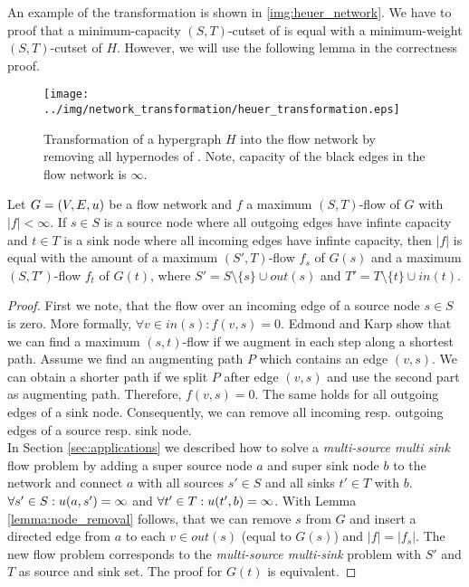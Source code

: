 An example of the transformation is shown in \autoref{img:heuer_network}.
We have to proof that a minimum-capacity $(S,T)$-cutset
of  is equal with a minimum-weight $(S,T)$-cutset of $H$. However,
we will use the following lemma in the correctness proof.

\begin{figure}
\centering
\texttt{[image: ../img/network\_transformation/heuer\_transformation.eps]}
\caption{Transformation of a hypergraph $H$ into the flow network  by removing
         all hypernodes of . Note, capacity of the black edges in the flow network is $\infty$.}
\label{img:heuer_network}
\end{figure} 

\begin{lemma}
\label{lemma:source_and_sink_removal}
Let $G = (V,E,u)$ be a flow network and $f$ a maximum $(S,T)$-flow of $G$ with $|f| < \infty$.
If $s \in S$ is a source node where all outgoing edges have infinte capacity and
$t \in T$ is a sink node where all incoming edges have infinte capacity, then
$|f|$ is equal with the amount of a maximum $(S',T)$-flow $f_s$ of $G(s)$ and a maximum
$(S,T')$-flow $f_t$ of $G(t)$, where $S' = S\setminus \{s\} \cup out(s)$ 
and $T' = T \setminus \{t\} \cup in(t)$.
\end{lemma}

\begin{proof}
First we note, that the flow over an incoming edge of a source node $s \in S$ is zero.
More formally, $\forall v \in in(s): f(v,s) = 0$. Edmond and Karp \cite{edmonds1972theoretical} 
show that we can find a maximum $(s,t)$-flow if we augment in each step along a shortest path. 
Assume we find an augmenting path $P$ which contains an edge $(v,s)$. We
can obtain a shorter path if we split $P$ after edge $(v,s)$ and use the second part as
augmenting path. Therefore, $f(v,s) = 0$. The same holds for all outgoing edges of a sink
node. Consequently, we can remove all incoming resp. outgoing edges of a source resp. sink node. \\
In Section \ref{sec:applications} we described how to solve a \emph{multi-source 
multi sink} flow problem by adding a super source node $a$ and super sink node $b$ to the network
and connect $a$ with all sources $s' \in S$ and all sinks $t' \in T$ with $b$.
$\forall s' \in S: u(a,s') = \infty$ and $\forall t' \in T: u(t',b) = \infty$. With Lemma
\ref{lemma:node_removal} follows, that we can remove $s$ from $G$ and insert
a directed edge from $a$ to each $v \in out(s)$ (equal to $G(s)$) and $|f| = |f_s|$. The new flow problem
corresponds to the \emph{multi-source multi-sink} problem with $S'$ and $T$ as source
and sink set. The proof for $G(t)$ is equivalent.
\end{proof}

